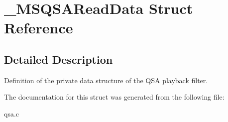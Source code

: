 \section{\-\_\-\-M\-S\-Q\-S\-A\-Read\-Data Struct Reference}
\label{struct__MSQSAReadData}


\subsection{Detailed Description}
Definition of the private data structure of the Q\-S\-A playback filter. 

The documentation for this struct was generated from the following file\-:\begin{DoxyCompactItemize}
\item 
qsa.\-c\end{DoxyCompactItemize}
